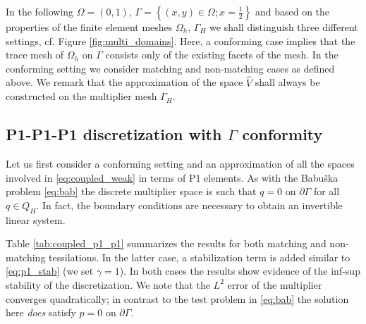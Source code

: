 \documentclass[r]{siamart171218}
\begin{document}
%
In the following $\Omega=(0, 1)$, $\Gamma=\left\{(x, y)\in\Omega; x=\tfrac{1}{2}\right\}$
and based on the properties of the finite element meshes $\Omega_h$, $\Gamma_H$
we shall distinguish three different settings, cf. Figure \ref{fig:multi_domains}.
Here, a conforming case implies that the trace mesh of $\Omega_h$ on $\Gamma$
consists only of the existing facets of the mesh. In the conforming setting 
we consider matching and non-matching cases as defined above. We remark
that the approximation of the space $\hat{V}$ shall always be constructed
on the multiplier mesh $\Gamma_H$.

\subsection{P1-P1-P1 discretization with $\Gamma$ conformity}
Let us first consider a conforming setting and an approximation of all
the spaces involved in \eqref{eq:coupled_weak} in terms of P1 elements.
As with the Babu{\v s}ka problem \eqref{eq:bab} the discrete multiplier
space is such that $q=0$ on $\partial\Gamma$ for all $q\in Q_H$. In fact,
the boundary conditions are necessary to obtain an invertible linear system.

Table \ref{tab:coupled_p1_p1} summarizes the results for both matching
and non-matching tessilations. In the latter case, a stabilization term
\cite{burman2009interior} is added similar to \eqref{eq:p1_stab} (we set $\gamma=1$).
In both cases the results show evidence of the inf-sup stability of the
discretization. We note that the $L^2$ error of the multiplier converges
quadratically; in contrast to the test problem in \eqref{eq:bab} the solution
here \emph{does} satisfy $p=0$ on $\partial\Gamma$.
\end{document}
